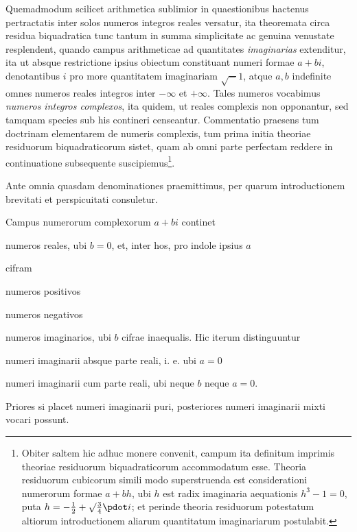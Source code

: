 Quemadmodum scilicet arithmetica sublimior in quaestionibus hactenus pertractatis inter solos numeros integros reales versatur, ita theoremata circa residua biquadratica tunc tantum in summa simplicitate ac genuina venustate resplendent, quando campus arithmeticae ad quantitates \emph{imaginarias} extenditur, ita ut absque restrictione ipsius obiectum constituant numeri formae $a+bi$, denotantibus $i$ pro more quantitatem imaginariam $\surd-1$, atque $a,b$ indefinite omnes numeros reales integros inter $-\infty$ et $+\infty$. Tales numeros vocabimus \emph{numeros integros complexos}, ita quidem, ut reales complexis non opponantur, sed tamquam species sub his contineri censeantur. Commentatio praesens tum doctrinam elementarem de numeris complexis, tum prima initia theoriae residuorum biquadraticorum sistet, quam ab omni parte perfectam reddere in continuatione subsequente suscipiemus\begingroup\renewcommand{\thefootnote}{*)}\footnote{Obiter saltem hic adhuc monere convenit, campum ita definitum imprimis theoriae residuorum biquadraticorum accommodatum esse. Theoria residuorum cubicorum simili modo superstruenda est considerationi numerorum formae $a+bh$, ubi $h$ est radix imaginaria aequationis $h^3-1=0$, puta $h=-\frac12+\surd\frac34\pdot i$; et perinde theoria residuorum potestatum altiorum introductionem aliarum quantitatum imaginariarum postulabit.}\endgroup.

Ante omnia quasdam denominationes praemittimus, per quarum introductionem brevitati et perspicuitati consuletur.

Campus numerorum complexorum $a+bi$ continet
\begin{list}{}{\setlength{\leftmargin}{1.6em}\setlength{\labelwidth}{1.4em}\setlength{\labelsep}{.2em}}
\item[I.] numeros reales, ubi $b=0$, et, inter hos, pro indole ipsius $a$
\begin{list}{}{\setlength{\leftmargin}{1.7em}\setlength{\labelwidth}{1.5em}\setlength{\labelsep}{.2em}}
\item[1)] cifram
\item[2)] numeros positivos
\item[3)] numeros negativos
\end{list}
\item[II.] numeros imaginarios, ubi $b$ cifrae inaequalis. Hic iterum distinguuntur
\begin{list}{}{\setlength{\leftmargin}{1.7em}\setlength{\labelwidth}{1.5em}\setlength{\labelsep}{.2em}}
\item[1)] numeri imaginarii absque parte reali, i. e. ubi $a=0$
\item[2)] numeri imaginarii cum parte reali, ubi neque $b$ neque $a=0$.
\end{list}
\end{list}
Priores si placet numeri imaginarii puri, posteriores numeri imaginarii mixti vocari possunt.

